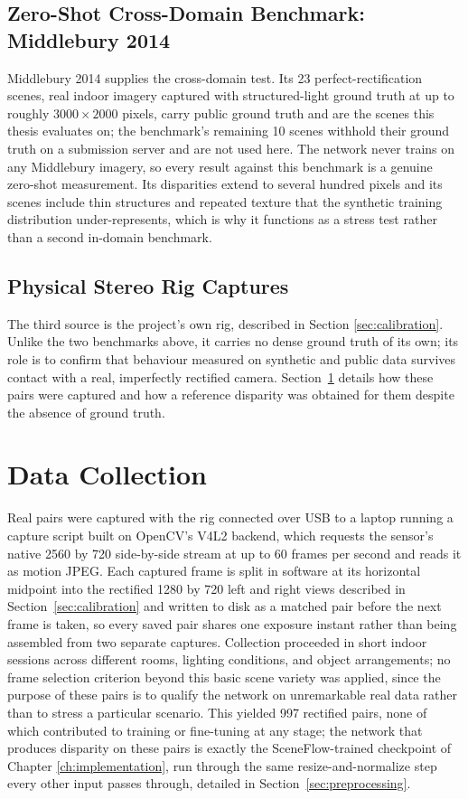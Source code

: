 \subsection{Zero-Shot Cross-Domain Benchmark: Middlebury 2014}
Middlebury 2014 \cite{scharstein2014middlebury} supplies the cross-domain
test. Its 23 perfect-rectification scenes, real indoor imagery captured
with structured-light ground truth at up to roughly $3000\times 2000$
pixels, carry public ground truth and are the scenes this thesis
evaluates on; the benchmark's remaining 10 scenes withhold their ground
truth on a submission server and are not used here. The network never
trains on any Middlebury imagery, so every result against this
benchmark is a genuine zero-shot measurement.
Its disparities extend to several hundred pixels and its scenes include
thin structures and repeated texture that the synthetic training
distribution under-represents, which is why it functions as a stress
test rather than a second in-domain benchmark.

\subsection{Physical Stereo Rig Captures}
The third source is the project's own rig, described in Section
\ref{sec:calibration}. Unlike the two benchmarks above, it carries no
dense ground truth of its own; its role is to confirm that behaviour
measured on synthetic and public data survives contact with a real,
imperfectly rectified camera. Section~\ref{sec:data_collection} details
how these pairs were captured and how a reference disparity was
obtained for them despite the absence of ground truth.

\FloatBarrier
\section{Data Collection}
\label{sec:data_collection}
Real pairs were captured with the rig connected over USB to a laptop
running a capture script built on OpenCV's V4L2 backend, which requests
the sensor's native 2560 by 720 side-by-side stream at up to 60 frames
per second and reads it as motion JPEG. Each captured frame is split in
software at its horizontal midpoint into the rectified 1280 by 720 left
and right views described in Section~\ref{sec:calibration} and written
to disk as a matched pair before the next frame is taken, so every saved
pair shares one exposure instant rather than being assembled from two
separate captures. Collection proceeded in short indoor sessions across
different rooms, lighting conditions, and object arrangements; no frame
selection criterion beyond this basic scene variety was applied, since
the purpose of these pairs is to qualify the network on unremarkable
real data rather than to stress a particular scenario. This yielded 997
rectified pairs, none of which contributed to training or fine-tuning at
any stage; the network that produces disparity on these pairs is exactly
the SceneFlow-trained checkpoint of Chapter \ref{ch:implementation}, run
through the same resize-and-normalize step every other input passes
through, detailed in Section~\ref{sec:preprocessing}.

